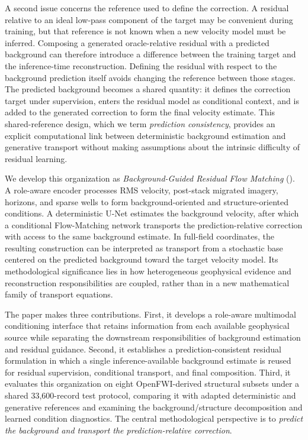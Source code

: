 A second issue concerns the reference used to define the correction. A residual relative to an ideal low-pass component of the target may be convenient during training, but that reference is not known when a new velocity model must be inferred. Composing a generated oracle-relative residual with a predicted background can therefore introduce a difference between the training target and the inference-time reconstruction. Defining the residual with respect to the background prediction itself avoids changing the reference between those stages. The predicted background becomes a shared quantity: it defines the correction target under supervision, enters the residual model as conditional context, and is added to the generated correction to form the final velocity estimate. This shared-reference design, which we term \emph{prediction consistency}, provides an explicit computational link between deterministic background estimation and generative transport without making assumptions about the intrinsic difficulty of residual learning.

We develop this organization as \emph{Background-Guided Residual Flow Matching} (\method). A role-aware encoder processes RMS velocity, post-stack migrated imagery, horizons, and sparse wells to form background-oriented and structure-oriented conditions. A deterministic U-Net estimates the background velocity, after which a conditional Flow-Matching network transports the prediction-relative correction with access to the same background estimate. In full-field coordinates, the resulting construction can be interpreted as transport from a stochastic base centered on the predicted background toward the target velocity model. Its methodological significance lies in how heterogeneous geophysical evidence and reconstruction responsibilities are coupled, rather than in a new mathematical family of transport equations.

The paper makes three contributions. First, it develops a role-aware multimodal conditioning interface that retains information from each available geophysical source while separating the downstream responsibilities of background estimation and residual guidance. Second, it establishes a prediction-consistent residual formulation in which a single inference-available background estimate is reused for residual supervision, conditional transport, and final composition. Third, it evaluates this organization on eight OpenFWI-derived structural subsets under a shared 33,600-record test protocol, comparing it with adapted deterministic and generative references and examining the background/structure decomposition and learned condition diagnostics. The central methodological perspective is to \emph{predict the background and transport the prediction-relative correction}.
